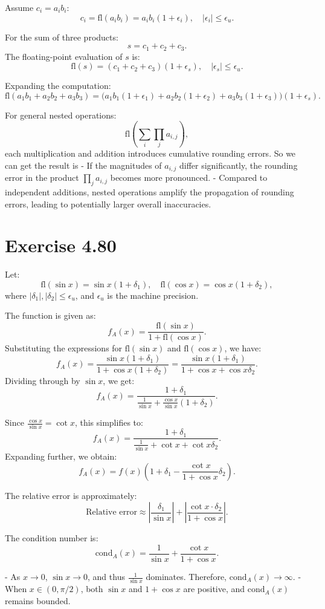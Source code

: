 \documentclass{article}
\begin{document}
Assume \( c_i = a_i b_i \):
\[
c_i = \text{fl}(a_i b_i) = a_i b_i (1 + \epsilon_i), \quad |\epsilon_i| \leq \epsilon_u.
\]

For the sum of three products:
\[
s = c_1 + c_2 + c_3.
\]
The floating-point evaluation of \( s \) is:
\[
\text{fl}(s) = (c_1 + c_2 + c_3)(1 + \epsilon_s), \quad |\epsilon_s| \leq \epsilon_u.
\]

Expanding the computation:
\[
\text{fl}(a_1 b_1 + a_2 b_2 + a_3 b_3) = \big(a_1 b_1 (1 + \epsilon_1) + a_2 b_2 (1 + \epsilon_2) + a_3 b_3 (1 + \epsilon_3)\big)(1 + \epsilon_s).
\]

For general nested operations:
\[
\text{fl}\left(\sum_i \prod_j a_{i,j}\right),
\]
each multiplication and addition introduces cumulative rounding errors.
So we can get the result is
- If the magnitudes of \( a_{i,j} \) differ significantly, the rounding error in the product \( \prod_j a_{i,j} \) becomes more pronounced.
- Compared to independent additions, nested operations amplify the propagation of rounding errors, leading to potentially larger overall inaccuracies.




\section{Exercise 4.80}

Let:
\[
\text{fl}(\sin x) = \sin x (1 + \delta_1), \quad \text{fl}(\cos x) = \cos x (1 + \delta_2),
\]
where \( |\delta_1|, |\delta_2| \leq \epsilon_u \), and \( \epsilon_u \) is the machine precision.

The function is given as:
\[
f_A(x) = \frac{\text{fl}(\sin x)}{1 + \text{fl}(\cos x)}.
\]
Substituting the expressions for \(\text{fl}(\sin x)\) and \(\text{fl}(\cos x)\), we have:
\[
f_A(x) = \frac{\sin x (1 + \delta_1)}{1 + \cos x (1 + \delta_2)} = \frac{\sin x (1 + \delta_1)}{1 + \cos x + \cos x \delta_2}.
\]
Dividing through by \(\sin x\), we get:
\[
f_A(x) = \frac{1 + \delta_1}{\frac{1}{\sin x} + \frac{\cos x}{\sin x} (1 + \delta_2)}.
\]

Since \(\frac{\cos x}{\sin x} = \cot x\), this simplifies to:
\[
f_A(x) = \frac{1 + \delta_1}{\frac{1}{\sin x} + \cot x + \cot x \delta_2}.
\]
Expanding further, we obtain:
\[
f_A(x) = f(x) \left(1 + \delta_1 - \frac{\cot x}{1 + \cos x} \delta_2\right).
\]

The relative error is approximately:
\[
\text{Relative error} \approx \left| \frac{\delta_1}{\sin x} \right| + \left| \frac{\cot x \cdot \delta_2}{1 + \cos x} \right|.
\]

The condition number is:
\[
\text{cond}_A(x) = \frac{1}{\sin x} + \frac{\cot x}{1 + \cos x}.
\]

- As \( x \to 0 \), \(\sin x \to 0\), and thus \(\frac{1}{\sin x}\) dominates. Therefore, \(\text{cond}_A(x) \to \infty\).
- When \( x \in (0, \pi/2) \), both \(\sin x\) and \(1 + \cos x\) are positive, and \(\text{cond}_A(x)\) remains bounded.
\end{document}
